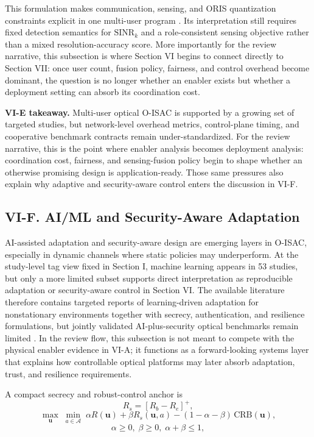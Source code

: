 This formulation makes communication, sensing, and ORIS quantization constraints explicit in one multi-user program \cite{O_ISAC_061,O_ISAC_091,O_ISAC_127}. Its interpretation still requires fixed detection semantics for $\mathrm{SINR}_k$ and a role-consistent sensing objective rather than a mixed resolution-accuracy score. More importantly for the review narrative, this subsection is where Section VI begins to connect directly to Section VII: once user count, fusion policy, fairness, and control overhead become dominant, the question is no longer whether an enabler exists but whether a deployment setting can absorb its coordination cost.

\textbf{VI-E takeaway.} Multi-user optical O-ISAC is supported by a growing set of targeted studies, but network-level overhead metrics, control-plane timing, and cooperative benchmark contracts remain under-standardized. For the review narrative, this is the point where enabler analysis becomes deployment analysis: coordination cost, fairness, and sensing-fusion policy begin to shape whether an otherwise promising design is application-ready. Those same pressures also explain why adaptive and security-aware control enters the discussion in VI-F.

\subsection{VI-F. AI/ML and Security-Aware Adaptation}

AI-assisted adaptation and security-aware design are emerging layers in O-ISAC, especially in dynamic channels where static policies may underperform. At the study-level tag view fixed in Section I, machine learning appears in 53 studies, but only a more limited subset supports direct interpretation as reproducible adaptation or security-aware control in Section VI. The available literature therefore contains targeted reports of learning-driven adaptation for nonstationary environments together with secrecy, authentication, and resilience formulations, but jointly validated AI-plus-security optical benchmarks remain limited \cite{O_ISAC_127,O_ISAC_145,O_ISAC_156,O_ISAC_163}. In the review flow, this subsection is not meant to compete with the physical enabler evidence in VI-A; it functions as a forward-looking systems layer that explains how controllable optical platforms may later absorb adaptation, trust, and resilience requirements.

A compact secrecy and robust-control anchor is
\[
R_s=[R_b-R_e]^+,
\]
\[
\max_{\mathbf{u}}\;\min_{a\in\mathcal A}\;\alpha R(\mathbf{u})+\beta R_s(\mathbf{u},a)-(1-\alpha-\beta)\,\mathrm{CRB}(\mathbf{u}),
\]
\[
\alpha\ge 0,\;\beta\ge 0,\;\alpha+\beta\le 1,
\]

